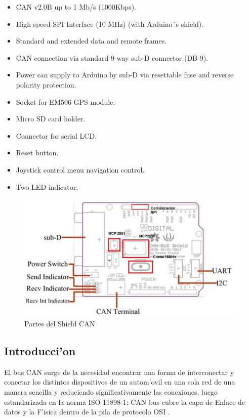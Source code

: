 \begin{itemize}
	\item CAN v2.0B up to 1 Mb/s (1000Kbps).
	\item High speed SPI Interface (10 MHz) (with Arduino´s shield).
	\item Standard and extended data and remote frames.
	\item CAN connection via standard 9-way sub-D connector (DB-9).
	\item Power can supply to Arduino by sub-D via resettable fuse and reverse polarity protection.
	\item Socket for EM506 GPS module.
	\item Micro SD card holder.
	\item Connector for serial LCD.
	\item Reset button.
	\item Joystick control menu navigation control.
	\item Two LED indicator.
\end{itemize}
\begin{figure}[ht]
	\centering
		\includegraphics[scale=0.6]{canpartes}
	\caption{Partes del Shield CAN}
	\label{fig:canpartes}
\end{figure}





\subsection{Introducci'on}

El bus CAN  surge de la necesidad encontrar una forma de interconectar y conectar los distintos dispositivos de un autom'ovil en una sola red de una manera sencilla y reduciendo significativamente las conexiones, luego estandarizada en la norma ISO 11898-1; CAN bus cubre la capa de Enlace de datos y la F'isica  dentro de la pila de protocolo OSI \citep{garcia}.

